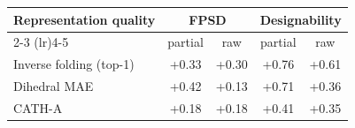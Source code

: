 \begin{tabular}{l cc cc}
\toprule
\textbf{Representation quality} & \multicolumn{2}{c}{\textbf{FPSD}} & \multicolumn{2}{c}{\textbf{Designability}} \\
\cmidrule(lr){2-3} \cmidrule(lr){4-5}
 & partial & raw & partial & raw \\
\midrule
Inverse folding (top-1) & +0.33 & +0.30 & +0.76 & +0.61 \\
Dihedral MAE & +0.42 & +0.13 & +0.71 & +0.36 \\
CATH-A & +0.18 & +0.18 & +0.41 & +0.35 \\
\bottomrule
\end{tabular}
